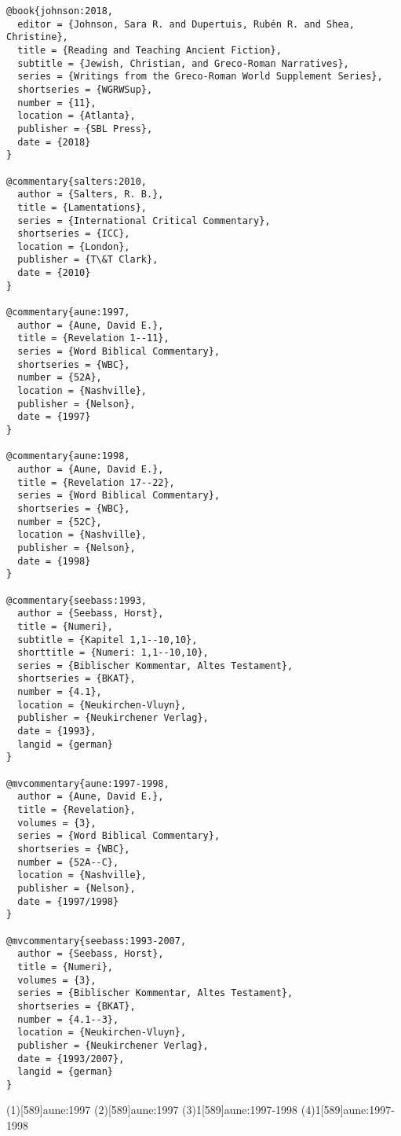 \documentclass[a4paper]{article}
\begin{document}
\begin{verbatim}
@book{johnson:2018,
  editor = {Johnson, Sara R. and Dupertuis, Rubén R. and Shea, Christine},
  title = {Reading and Teaching Ancient Fiction},
  subtitle = {Jewish, Christian, and Greco-Roman Narratives},
  series = {Writings from the Greco-Roman World Supplement Series},
  shortseries = {WGRWSup},
  number = {11},
  location = {Atlanta},
  publisher = {SBL Press},
  date = {2018}
}

@commentary{salters:2010,
  author = {Salters, R. B.},
  title = {Lamentations},
  series = {International Critical Commentary},
  shortseries = {ICC},
  location = {London},
  publisher = {T\&T Clark},
  date = {2010}
}

@commentary{aune:1997,
  author = {Aune, David E.},
  title = {Revelation 1--11},
  series = {Word Biblical Commentary},
  shortseries = {WBC},
  number = {52A},
  location = {Nashville},
  publisher = {Nelson},
  date = {1997}
}

@commentary{aune:1998,
  author = {Aune, David E.},
  title = {Revelation 17--22},
  series = {Word Biblical Commentary},
  shortseries = {WBC},
  number = {52C},
  location = {Nashville},
  publisher = {Nelson},
  date = {1998}
}

@commentary{seebass:1993,
  author = {Seebass, Horst},
  title = {Numeri},
  subtitle = {Kapitel 1,1--10,10},
  shorttitle = {Numeri: 1,1--10,10},
  series = {Biblischer Kommentar, Altes Testament},
  shortseries = {BKAT},
  number = {4.1},
  location = {Neukirchen-Vluyn},
  publisher = {Neukirchener Verlag},
  date = {1993},
  langid = {german}
}

@mvcommentary{aune:1997-1998,
  author = {Aune, David E.},
  title = {Revelation},
  volumes = {3},
  series = {Word Biblical Commentary},
  shortseries = {WBC},
  number = {52A--C},
  location = {Nashville},
  publisher = {Nelson},
  date = {1997/1998}
}

@mvcommentary{seebass:1993-2007,
  author = {Seebass, Horst},
  title = {Numeri},
  volumes = {3},
  series = {Biblischer Kommentar, Altes Testament},
  shortseries = {BKAT},
  number = {4.1--3},
  location = {Neukirchen-Vluyn},
  publisher = {Neukirchener Verlag},
  date = {1993/2007},
  langid = {german}
}
\end{verbatim}

\examplecite(1)[589]{aune:1997}
\examplecite(2)[589]{aune:1997}
\examplevolcite(3){1}[589]{aune:1997-1998}
\examplevolcite(4){1}[589]{aune:1997-1998}
\exampleabbreviations
\examplebibliography
{}
\end{document}
